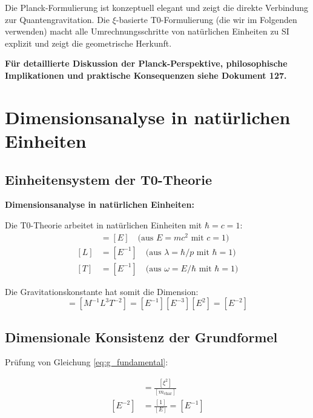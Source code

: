 	Die Planck-Formulierung ist konzeptuell elegant und zeigt die direkte Verbindung zur Quantengravitation. Die $\xi$-basierte T0-Formulierung (die wir im Folgenden verwenden) macht alle Umrechnungsschritte von natürlichen Einheiten zu SI explizit und zeigt die geometrische Herkunft.
	
	\textbf{Für detaillierte Diskussion der Planck-Perspektive, philosophische Implikationen und praktische Konsequenzen siehe Dokument 127.}
	
	\section{Dimensionsanalyse in natürlichen Einheiten}
	
	\subsection{Einheitensystem der T0-Theorie}
	
	\begin{dimensional}
		\textbf{Dimensionsanalyse in natürlichen Einheiten:}
		
		Die T0-Theorie arbeitet in natürlichen Einheiten mit $\hbar = c = 1$:
		\begin{align}
			[M] &= [E] \quad \text{(aus } E = mc^2 \text{ mit } c = 1\text{)} \\
			[L] &= [E^{-1}] \quad \text{(aus } \lambda = \hbar/p \text{ mit } \hbar = 1\text{)} \\
			[T] &= [E^{-1}] \quad \text{(aus } \omega = E/\hbar \text{ mit } \hbar = 1\text{)}
		\end{align}
		
		Die Gravitationskonstante hat somit die Dimension:
		\begin{equation}
			[G] = [M^{-1}L^3T^{-2}] = [E^{-1}][E^{-3}][E^2] = [E^{-2}]
		\end{equation}
	\end{dimensional}
	
	\subsection{Dimensionale Konsistenz der Grundformel}
	
	Prüfung von Gleichung \eqref{eq:g_fundamental}:
	
	\begin{align}
		[G] &= \frac{[\xi^2]}{[m_{\text{char}}]} \\
		[E^{-2}] &= \frac{[1]}{[E]} = [E^{-1}]
	\end{align}
	
